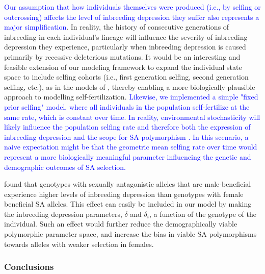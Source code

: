 \documentclass[11pt]{article}
\begin{document}
\textcolor{blue}{Our assumption that how individuals themselves were produced (i.e., by selfing or outcrossing) affects the level of inbreeding depression they suffer also represents a major simplification}. In reality, the history of consecutive generations of inbreeding in each individual's lineage will influence the severity of inbreeding depression they experience, particularly when inbreeding depression is caused primarily by recessive deleterious mutations. It would be an interesting and feasible extension of our modeling framework to expand the individual state space to include selfing cohorts (i.e., first generation selfing, second generation selfing, etc.), as in the models of \citet{kelly1999response,kelly2007mutation}, thereby enabling a more biologically plausible approach to modelling self-fertilization. \textcolor{blue}{Likewise, we implemented a simple "fixed prior selfing" model, where all individuals in the population self-fertilize at the same rate, which is constant over time. In reality, environmental stochasticity will likely influence the population selfing rate and therefore both the expression of inbreeding depression and the scope for SA polymorphism \citep{JordanConnallon2014,Olito-etal-2018}. In this scenario, a naive expectation might be that the geometric mean selfing rate over time would represent a more biologically meaningful parameter influencing the genetic and demographic outcomes of SA selection.}


\cite{grieshop2017male} found that genotypes with sexually antagonistic alleles that are male-beneficial experience higher levels of inbreeding depression than genotypes with female beneficial SA alleles. This effect can easily be included in our model by making the inbreeding depression parameters, $\delta$ and $\delta_i$, a function of the genotype of the individual. Such an effect would further reduce the demographically viable polymorphic parameter space, and increase the bias in viable SA polymorphisms towards alleles with weaker selection in females.


\subsubsection*{Conclusions} 
\end{document}
